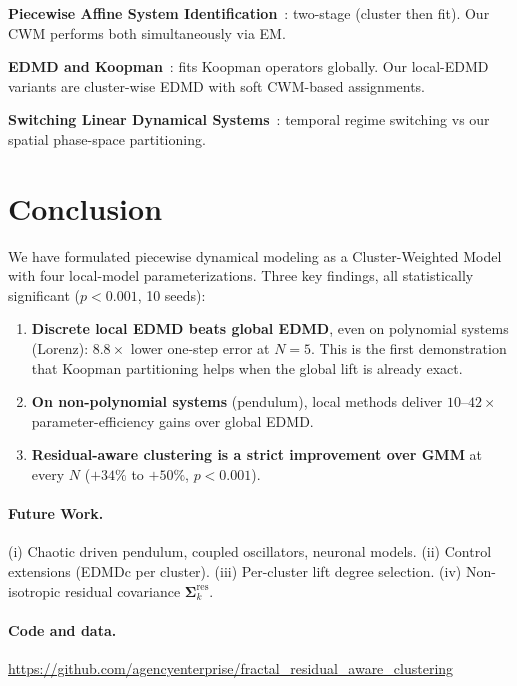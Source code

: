 \documentclass[11pt]{article}
\theoremstyle{definition}
\newcommand{\Sv}{\boldsymbol{\Sigma}}
\begin{document}
\textbf{Piecewise Affine System Identification}~\cite{ferrari2003clustering,paoletti2007identification}: two-stage (cluster then fit). Our CWM performs both simultaneously via EM.

\textbf{EDMD and Koopman}~\cite{williams2015data,klus2020data,brunton2022modern}: fits Koopman operators globally. Our local-EDMD variants are cluster-wise EDMD with soft CWM-based assignments.

\textbf{Switching Linear Dynamical Systems}~\cite{fox2011bayesian,ghahramani2000variational}: temporal regime switching vs our spatial phase-space partitioning.

\section{Conclusion}

We have formulated piecewise dynamical modeling as a Cluster-Weighted Model with four local-model parameterizations. Three key findings, all statistically significant ($p<0.001$, 10 seeds):

\begin{enumerate}[leftmargin=*,itemsep=2pt]
  \item \textbf{Discrete local EDMD beats global EDMD}, even on polynomial systems (Lorenz): $8.8\times$ lower one-step error at $N=5$. This is the first demonstration that Koopman partitioning helps when the global lift is already exact.
  \item \textbf{On non-polynomial systems} (pendulum), local methods deliver $10$--$42\times$ parameter-efficiency gains over global EDMD.
  \item \textbf{Residual-aware clustering is a strict improvement over GMM} at every $N$ ($+34\%$ to $+50\%$, $p<0.001$).
\end{enumerate}

\paragraph{Future Work.} (i) Chaotic driven pendulum, coupled oscillators, neuronal models. (ii) Control extensions (EDMDc per cluster). (iii) Per-cluster lift degree selection. (iv) Non-isotropic residual covariance $\Sv_k^{\mathrm{res}}$.

\paragraph{Code and data.} \url{https://github.com/agencyenterprise/fractal_residual_aware_clustering}
\end{document}
